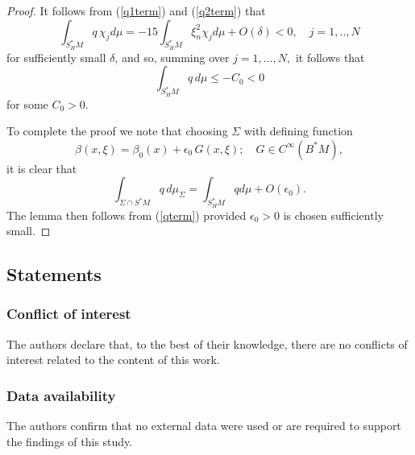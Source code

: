 \documentclass[11pt,reqno]{amsart}
\theoremstyle{definition}
\begin{document}
\begin{proof}
It follows from (\ref{q1term}) and (\ref{q2term}) that
$$\int_{S_H^*M} q \, \chi_j d\mu = - 15 \int_{S_H^*M} \xi_n^2 \chi_j d\mu +O(\delta)<0,\quad j=1,..,N$$
for sufficiently small $\delta$, and so, summing over $j=1,...,N,$ it follows that
\begin{equation} \label{qterm}
\int_{S_H^*M} q \, d\mu  \leq -C_0 <0
\end{equation}
for some $C_0>0.$

To complete the proof we note that choosing $\Sigma$ with defining function 
$$ \beta(x,\xi) = \beta_0(x) +\epsilon_0 \, G(x,\xi); \quad G \in C^{\infty}(B^*M),$$
it is clear that
$$ \int_{\Sigma \cap S^*M} q \, d\mu_{\Sigma} = \int_{S_H^*M} q d\mu + O(\epsilon_0).$$
The lemma then follows from (\ref{qterm}) provided $\epsilon_0>0$ is chosen sufficiently small.
\end{proof}

\bigskip

\subsection*{Statements}
\subsubsection*{Conflict of interest} The authors declare that, to the best of their knowledge, there are no conflicts of interest related to the content of this work.
\subsubsection*{Data availability} The authors confirm that no external data were used or are required to support the findings of this study.



\end{document}
